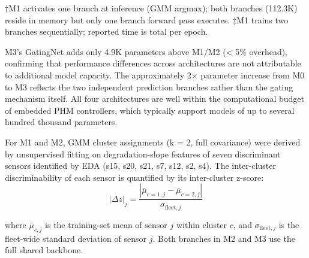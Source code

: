 \documentclass[preprint,10pt]{elsarticle}
\begin{document}
\begin{table}[!t]
\centering
\small
\caption{Computational complexity of H3 architectures (FD003, $F$ = 15 features)}
\label{tab:ii}
\end{table}

†M1 activates one branch at inference (GMM argmax); both branches (112.3K) reside in memory but only one branch forward pass executes.  ‡M1 trains two branches sequentially; reported time is total per epoch.

M3's GatingNet adds only 4.9K parameters above M1/M2 (< 5\% overhead), confirming that performance differences across architectures are not attributable to additional model capacity. The approximately 2× parameter increase from M0 to M3 reflects the two independent prediction branches rather than the gating mechanism itself. All four architectures are well within the computational budget of embedded PHM controllers, which typically support models of up to several hundred thousand parameters.

For M1 and M2, GMM cluster assignments (k = 2, full covariance) were derived by unsupervised fitting on degradation-slope features of seven discriminant sensors identified by EDA (s15, s20, s21, s7, s12, s2, s4). The inter-cluster discriminability of each sensor is quantified by its inter-cluster z-score:
\begin{equation}
|\Delta z|_j = \frac{|\bar{\mu}_{c=1,j} - \bar{\mu}_{c=2,j}|}{\sigma_{\text{fleet},j}}
\end{equation}

where $\bar{\mu}_{c,j}$ is the training-set mean of sensor $j$ within cluster $c$, and $\sigma_{\text{fleet},j}$ is the fleet-wide standard deviation of sensor $j$. Both branches in M2 and M3 use the full shared backbone.
\end{document}
